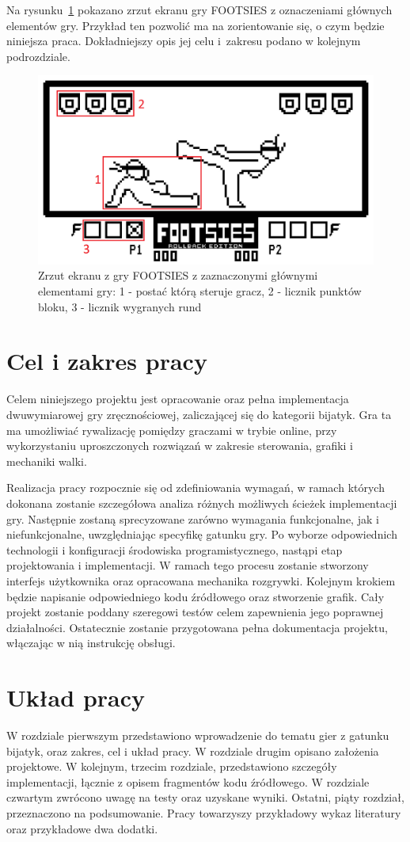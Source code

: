 Na rysunku~\ref{fig:footsies} pokazano zrzut ekranu gry FOOTSIES z oznaczeniami głównych elementów gry. Przykład ten pozwolić ma na zorientowanie się, o czym będzie niniejsza praca. Dokładniejszy opis jej celu i~zakresu podano w kolejnym podrozdziale.
\begin{figure}
	\centering
		\includegraphics[width=0.64\linewidth]{rys01/footsies}
	\caption{Zrzut ekranu z gry FOOTSIES z zaznaczonymi głównymi elementami gry: 1 - postać którą steruje gracz, 2 - licznik punktów bloku, 3 - licznik wygranych rund}
	\label{fig:footsies}
\end{figure}



\section{Cel i zakres pracy}
Celem niniejszego projektu jest opracowanie oraz pełna implementacja dwuwymiarowej gry zręcznościowej, zaliczającej się do kategorii bijatyk. Gra ta ma umożliwiać rywalizację pomiędzy graczami w trybie online, przy wykorzystaniu uproszczonych rozwiązań w zakresie sterowania, grafiki i mechaniki walki.

Realizacja pracy rozpocznie się od zdefiniowania wymagań, w ramach których dokonana zostanie szczegółowa analiza różnych możliwych ścieżek implementacji gry. Następnie zostaną sprecyzowane zarówno wymagania funkcjonalne, jak i niefunkcjonalne, uwzględniając specyfikę gatunku gry. Po wyborze odpowiednich technologii i konfiguracji środowiska programistycznego, nastąpi etap projektowania i implementacji. W ramach tego procesu zostanie stworzony interfejs użytkownika oraz opracowana mechanika rozgrywki. Kolejnym krokiem będzie napisanie odpowiedniego kodu źródłowego oraz stworzenie grafik. Cały projekt zostanie poddany szeregowi testów celem zapewnienia jego poprawnej działalności. Ostatecznie zostanie przygotowana pełna dokumentacja projektu, włączając w nią instrukcję obsługi.

\section{Układ pracy}
W rozdziale pierwszym przedstawiono wprowadzenie do tematu gier z gatunku bijatyk, oraz zakres, cel i układ pracy.
W rozdziale drugim opisano założenia projektowe.
W kolejnym, trzecim rozdziale, przedstawiono szczegóły implementacji, łącznie z opisem fragmentów kodu źródłowego.
W rozdziale czwartym zwrócono uwagę na testy oraz uzyskane wyniki.
Ostatni, piąty rozdział, przeznaczono na podsumowanie.
Pracy towarzyszy przykładowy wykaz literatury oraz przykładowe dwa dodatki. 

